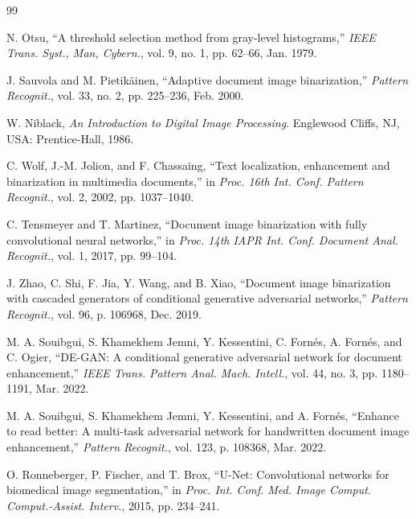 \documentclass[journal]{IEEEtran}
\begin{document}

\begin{thebibliography}{99}

N. Otsu, ``A threshold selection method from gray-level histograms,'' \textit{IEEE Trans. Syst., Man, Cybern.}, vol. 9, no. 1, pp. 62--66, Jan. 1979.

J. Sauvola and M. Pietikäinen, ``Adaptive document image binarization,'' \textit{Pattern Recognit.}, vol. 33, no. 2, pp. 225--236, Feb. 2000.

W. Niblack, \textit{An Introduction to Digital Image Processing}. Englewood Cliffs, NJ, USA: Prentice-Hall, 1986.

C. Wolf, J.-M. Jolion, and F. Chassaing, ``Text localization, enhancement and binarization in multimedia documents,'' in \textit{Proc. 16th Int. Conf. Pattern Recognit.}, vol. 2, 2002, pp. 1037--1040.

C. Tensmeyer and T. Martinez, ``Document image binarization with fully convolutional neural networks,'' in \textit{Proc. 14th IAPR Int. Conf. Document Anal. Recognit.}, vol. 1, 2017, pp. 99--104.

J. Zhao, C. Shi, F. Jia, Y. Wang, and B. Xiao, ``Document image binarization with cascaded generators of conditional generative adversarial networks,'' \textit{Pattern Recognit.}, vol. 96, p. 106968, Dec. 2019.

M. A. Souibgui, S. Khamekhem Jemni, Y. Kessentini, C. Fornés, A. Fornés, and C. Ogier, ``DE-GAN: A conditional generative adversarial network for document enhancement,'' \textit{IEEE Trans. Pattern Anal. Mach. Intell.}, vol. 44, no. 3, pp. 1180--1191, Mar. 2022.

M. A. Souibgui, S. Khamekhem Jemni, Y. Kessentini, and A. Fornés, ``Enhance to read better: A multi-task adversarial network for handwritten document image enhancement,'' \textit{Pattern Recognit.}, vol. 123, p. 108368, Mar. 2022.

O. Ronneberger, P. Fischer, and T. Brox, ``U-Net: Convolutional networks for biomedical image segmentation,'' in \textit{Proc. Int. Conf. Med. Image Comput. Comput.-Assist. Interv.}, 2015, pp. 234--241.


\end{thebibliography}
\end{document}
